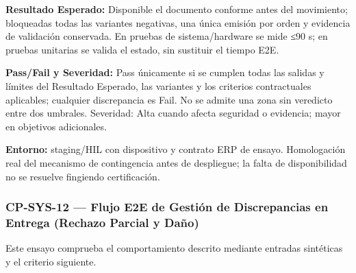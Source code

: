 \par\noindent\textbf{Resultado Esperado:} Disponible el documento conforme antes del movimiento; bloqueadas todas las variantes negativas, una única emisión por orden y evidencia de validación conservada. En pruebas de sistema/hardware se mide ≤90 s; en pruebas unitarias se valida el estado, sin sustituir el tiempo E2E.\par
\par\noindent\textbf{Pass/Fail y Severidad:} Pass únicamente si se cumplen todas las salidas y límites del Resultado Esperado, las variantes y los criterios contractuales aplicables; cualquier discrepancia es Fail. No se admite una zona sin veredicto entre dos umbrales. Severidad: Alta cuando afecta seguridad o evidencia; mayor en objetivos adicionales.\par
\par\noindent\textbf{Entorno:} staging/HIL con dispositivo y contrato ERP de ensayo. Homologación real del mecanismo de contingencia antes de despliegue; la falta de disponibilidad no se resuelve fingiendo certificación.\par

\subsubsection*{CP-SYS-12 — Flujo E2E de Gestión de Discrepancias en Entrega (Rechazo Parcial y Daño)}\label{sec:9-cp-sys-12}
Este ensayo comprueba el comportamiento descrito mediante entradas sintéticas y el criterio siguiente.


